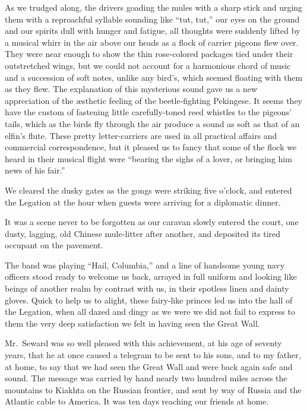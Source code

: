 \documentclass[12pt]{book}
\begin{document}
As we trudged along, the drivers goading the mules with a sharp stick and
urging them with a reproachful syllable sounding like “tut, tut,” our eyes on the
ground and our spirits dull with hunger and fatigue, all thoughts were suddenly
lifted by a musical whirr in the air above our heads as a flock of carrier pigeons
flew over. They were near enough to show the thin rose‐colored packages tied
under their outstretched wings, but we could not account for a harmonious chord
of music and a succession of soft notes, unlike any bird’s, which seemed floating
with them as they flew. The explanation of this mysterious sound gave us a new
appreciation of the æsthetic feeling of the beetle‐fighting Pekingese. It seems they
have the custom of fastening little carefully‐toned reed whistles to the pigeons’
tails, which as the birds fly through the air produce a sound as soft as that of
an elfin’s flute. These pretty letter‐carriers are used in all practical affairs and
commercial correspondence, but it pleased us to fancy that some of the flock we
heard in their musical flight were “bearing the sighs of a lover, or bringing him
news of his fair.”

We cleared the dusky gates as the gongs were striking five o’clock, and entered
the Legation at the hour when guests were arriving for a diplomatic dinner.

It was a scene never to be forgotten as our caravan slowly entered the court,
one dusty, lagging, old Chinese mule‐litter after another, and deposited its tired
occupant on the pavement.

The band was playing “Hail, Columbia,” and a line of handsome young navy
officers stood ready to welcome us back, arrayed in full uniform and looking like
beings of another realm by contrast with us, in their spotless linen and dainty
gloves. Quick to help us to alight, these fairy‐like princes led us into the hall of
the Legation, when all dazed and dingy as we were we did not fail to express to
them the very deep satisfaction we felt in having seen the Great Wall.

Mr.~Seward was so well pleased with this achievement, at his age of seventy
years, that he at once caused a telegram to be sent to his sons, and to my father,
at home, to say that we had seen the Great Wall and were back again safe and
sound. The message was carried by hand nearly two hundred miles across the
mountains to Kiakhta on the Russian frontier, and sent by way of Russia and the
Atlantic cable to America. It was ten days reaching our friends at home.
\end{document}
